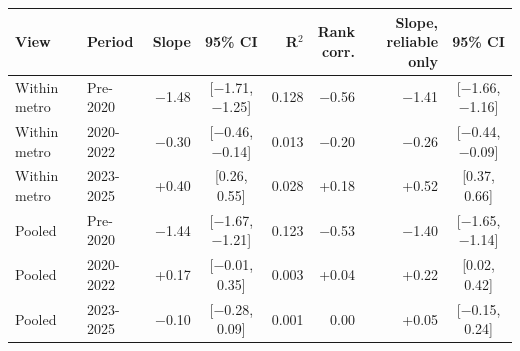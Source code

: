\footnotesize\setlength{\tabcolsep}{4pt}
\begin{tabular}{llrcrrrc}
\toprule
View & Period & Slope & 95\% CI & R$^2$ & \shortstack[r]{Rank\\corr.} & \shortstack[r]{Slope, reliable\\only} & 95\% CI \\
\midrule
Within metro & Pre-2020 & $-$1.48 & [$-$1.71, $-$1.25] & 0.128 & $-$0.56 & $-$1.41 & [$-$1.66, $-$1.16] \\
Within metro & 2020-2022 & $-$0.30 & [$-$0.46, $-$0.14] & 0.013 & $-$0.20 & $-$0.26 & [$-$0.44, $-$0.09] \\
Within metro & 2023-2025 & +0.40 & [0.26, 0.55] & 0.028 & +0.18 & +0.52 & [0.37, 0.66] \\
Pooled & Pre-2020 & $-$1.44 & [$-$1.67, $-$1.21] & 0.123 & $-$0.53 & $-$1.40 & [$-$1.65, $-$1.14] \\
Pooled & 2020-2022 & +0.17 & [$-$0.01, 0.35] & 0.003 & +0.04 & +0.22 & [0.02, 0.42] \\
Pooled & 2023-2025 & $-$0.10 & [$-$0.28, 0.09] & 0.001 & 0.00 & +0.05 & [$-$0.15, 0.24] \\
\bottomrule
\end{tabular}
